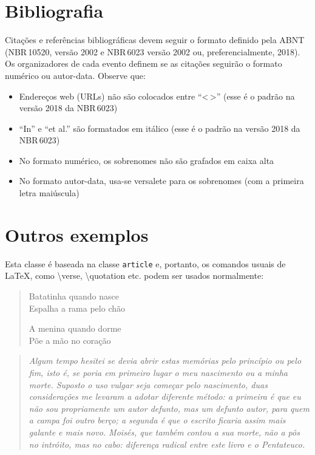 \documentclass[portuguese,notblind]{sbc20}
\begin{document}
\section{Bibliografia}

Citações e referências bibliográficas devem seguir o formato definido pela ABNT (NBR\,10520, versão 2002 e NBR\,6023 versão 2002 ou, preferencialmente, 2018). Os organizadores de cada evento definem se as citações seguirão o formato numérico ou autor-data. Observe que:

\begin{itemize}
  \item Endereços web (URLs) não são colocados entre ``<\,>'' (esse é o padrão na versão 2018 da NBR\,6023)
  \item ``In'' e ``et al.'' são formatados em itálico (esse é o padrão na versão 2018 da NBR\,6023)
  \item No formato numérico, os sobrenomes não são grafados em caixa alta
  \item No formato autor-data, usa-se versalete para os sobrenomes (com a primeira letra maiúscula)
\end{itemize}

\section{Outros exemplos}

Esta classe é baseada na classe \texttt{article} e, portanto, os comandos usuais de \LaTeX, como \textsf{\textbackslash{}verse}, \textsf{\textbackslash{}quotation} etc. podem ser usados normalmente:

\begin{verse}
Batatinha quando nasce\\
Espalha a rama pelo chão

A menina quando dorme\\
Põe a mão no coração
\end{verse}

\begin{quotation}
\itshape
Algum tempo hesitei se devia abrir estas memórias pelo princípio ou
pelo fim, isto é, se poria em primeiro lugar o meu nascimento ou a
minha morte. Suposto o uso vulgar seja começar pelo nascimento,
duas considerações me levaram a adotar diferente método: a
primeira é que eu não sou propriamente um autor defunto, mas um
defunto autor, para quem a campa foi outro berço; a segunda é que
o escrito ficaria assim mais galante e mais novo. Moisés, que também
contou a sua morte, não a pôs no intróito, mas no cabo: diferença
radical entre este livro e o Pentateuco.
\end{quotation}
\end{document}
